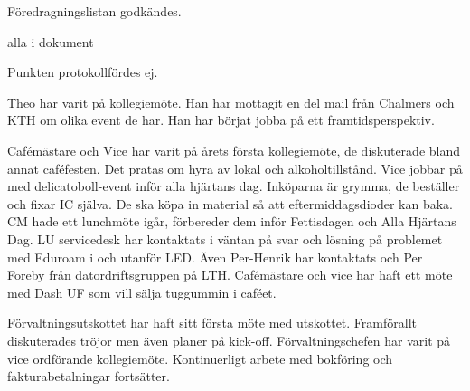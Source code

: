 \documentclass[10pt]{article}
\begin{document}
\begin{paragrafer}

Föredragningslistan godkändes.


\begin{fyllnadsval} %


alla i dokument

\end{fyllnadsval}

\begin{paragrafer}

Punkten protokollfördes ej.



Theo har varit på kollegiemöte. Han har mottagit en del mail från Chalmers och KTH om olika event de har. Han har börjat jobba på ett framtidsperspektiv.

Cafémästare och Vice har varit på årets första kollegiemöte, de diskuterade bland annat caféfesten. Det pratas om hyra av lokal och alkoholtillstånd.
Vice jobbar på med delicatoboll-event inför alla hjärtans dag. 
Inköparna är grymma, de beställer och fixar IC själva. De ska köpa in material så att eftermiddagsdioder kan baka.
CM hade ett lunchmöte igår, förbereder dem inför Fettisdagen och Alla Hjärtans Dag. 
LU servicedesk har kontaktats i väntan på svar och lösning på problemet med Eduroam i och utanför LED. Även Per-Henrik har kontaktats och Per Foreby från datordriftsgruppen på LTH.
Cafémästare och vice har haft ett möte med Dash UF som vill sälja tuggummin i caféet.

Förvaltningsutskottet har haft sitt första möte med utskottet. Framförallt diskuterades tröjor men även planer på kick-off. Förvaltningschefen har varit på vice ordförande kollegiemöte. Kontinuerligt arbete med bokföring och fakturabetalningar fortsätter.


\end{paragrafer}
\end{paragrafer}
\end{document}
